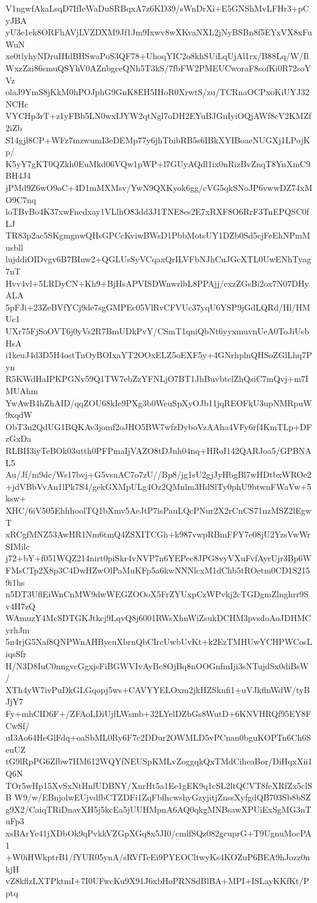 V1ngwfAkaLsqD7IfIeWaDuSRBqxA7z6KD39/sWnDrXi+E5GNShMvLFHr3+pCyJBA
yU3e1ek8ORFhAVjLVZDXM9Jf1Jm9Ixwv8wXKvaNXL2jNyBSBn8f5EYxVX8xFuWuN
xe0tlyhyNDruIHdBHSwaPoS3QF78+UhoqYIC2o8khSUiLqUjAl1rx/B88Lq/W/Il
WxzZzi86smuQSYhV0AZnbgceQNh5T3kS/7fbFW2PMEUCworaF8sofKi0R72soYVz
olaJ9YmS8jKkM0hPOJphG9GnK8EH5IHoR0XrwtS/zu/TCRnaOCPxoKiUYJ32NCHc
VYCHp3rT+z1yFBb5LN0wxIJYW2qtNgl7oDH2EYuBJGuIyiOQjAWf8cV2KMZf2iZb
S14gjl8CP+WFz7mzwumI3eDEMp77y6jhTbibRB5s6IBkXYIBoaeNUGXj1LPojKp/
K5yY7gKT0QZkh0EuMkd06VQw1pWP+l7GUyAQdl1ix0nRizBvZnqT8YnXmC9BH4J4
jPMd9Z6wO9oC+4D1mMXMsv/YwN9QXKyok6gg/cVG5qkSNoJP6vwwDZ74xMO9C7nq
loTBvBo4K37xwFnedxay1VLlhO83dd3J1TNE8es2E7xRXF8O6RrF3TnEPQSC0fLJ
TR83p2ac5SKgmgnwQHsGPCcKviwBWsD1PbbMotsUY1DZb0Sd5cjFeEhNPmMusbll
lujddiOIDvgv6B7BIuw2+QGLUsSyVCqaxQrILVFbNJhCuJGcXTL0UwENhTyag7nT
Hvv4vl+5LRDyCN+Kh9+BjHsAPVISDWnwrlbL8PPAjj/cxzZGsBi2ox7N07DHyALA
5pFJi+23ZeBVfYCj9de7sgGMPEc05VlRvCFVUc37yqU6YSP9jGdLQRd/Hl/HMUc1
UXr75FjSoOVT6j0yVs2R7BmUDkPvY/CSmT1qniQbNt6yyxmuvnUeA0ToJiUsbHsA
i1keuJ4d3D5H4ostTnOyBOIxaYT2OOxELZ5oEXF5y+4GNrhplnQHSoZGlLhq7Pyn
R5KWdHaIPKPGNv59Q1TW7ebZzYFNLjO7BT1JhBuvbtclZhQsiC7mQvj+m7IMUAhm
YwAwB4hZhAID/qqZOU68kIe9PXg3b0WeuSpXyOJb11jqREOFkU3upNMRpuW9xqdW
ObT3u2QdUG1BQKAv3jomf2oJHO5BW7wfzDyboVzAAha4VFy6rf4KmTLp+DFzGxDa
RLBII3iyTeBOk03utth0PFPmaIjVAZO8tDJnh04nq+HRoI142QARJoa5/GPBNAL5
Au/Jf/m9dc/Ws17bvj+G5vsnAC7o7zU//Bp8/jg1sU2gjJyHbgBl7wHDtbxWROe2
+jdVBbVvAn1lPk7S4/gekGXMpULg4Oz2QMnlm3HdSlTy0phU9btwnFWaVw+5ksw+
XHC/6iV505EhhhoolTQ1bXmv5AeJtP7isPauLQcPNur2X2rCnCS71nzMSZ2lEgwT
xRCgfMNZ53AwHR1Nm6tmQ4ZSXITCGh+k987vwpRBmFFY7e08jU2YzsVwWrSIMilc
j72+bY+f051WQZ214nirt0piSkr4vNVP7n6YEPec8JPG8vyVXuFvfAyrUjr3Bp6W
FMsCTp2X8p3C4DwHZwOlPaMuKFp5a6kwNNNlcxM1dChb5tROetm0CD1S2159i1hs
n5DT3UflEiWnCnMW9dwWEGZOOoX5FrZYUxpCzWPvkj2cTGDgmZlnghrr9Sv4H7zQ
WAmuzY4McSDTGKJtkcj9LqvQ8j6001RWsXhnWiZsukDCHM3pvsdoAoJDHMCyrhJm
5n4rjG5Naf8QNPWnAHByeuXbrnQbCIrcUwbUvKt+k2EzTMHUwYCHPWCosLiqsSfr
H/N3D8IuC0nngvcGgxjsFiBGWVIvAyBc8OjBq8nOOGnfmIji3sNTujdSx0diBsW/
XTh4yW7ivPuDkGLGqopj5ws+CAVYYELOxm2jkHZSknfi1+uVJkflnWdW/tyBJjY7
Fy+mhCID6F+/ZFAoLDiUjfLWsmb+32LYelDZbGs8WutD+6KNVHRQf95EY8FCwSf/
uI3Ao64HeGlFdq+oaSbML0Ry6F7c2DDur2OWMLD5vPCnan0bguKOPTn6Ch6SeuUZ
tG9lRpPG6Zfbw7HM612WQYfNEUSpKMLvZoggqkQxTMdCiheaBor/DiHqxXii1Q6N
TOr5wHp15XvSxNtHnfUDBNY/XnrHt5a1Ee1gEK9q1cSL2ltQCVT8feXRfZx5clSB
W9/w/EBnjolwEUjvdfbCTZDFi1ZqFbfhcwshyGzyjitjZnssXyfgdQB703Sb8bSZ
g9X2/CaiqTRiDnavXH5j5kcEa5jUUHMpnA6AQ0qkgMNBsawXPUiExSgMG3nTuFp3
xsBArYe41jXDbOk9qPvkkVZGpXGq8x5JI0/cmlfSQz082gcuprG+T9UgnuMocPA1
+W0iHWkptrB1/fYUR05ynA/sRVfTcEi9PYEOCltwyKs4KOZuP6BEA9hJozz0nkjH
vZ8kflzLXTPktmI+7I0UFwcKu9X91J6xbHoPRNSdBlBA+MPI+ISLayKKfKt/Pptq
